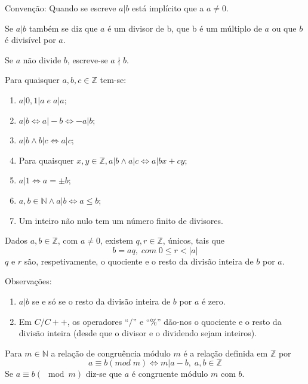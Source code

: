 Convenção: Quando se escreve $a|b$ está implícito que a $a \neq 0$.

Se $a|b$ também se diz que $a$ é um divisor de b, que b é um múltiplo de $a$ ou que $b$ é divisível por $a$.

Se $a$ não divide $b$, escreve-se $a \nmid b$.

Para quaisquer $a,b,c \in \mathbb{Z}$ tem-se:

\begin{enumerate}
    \item{ $a|0, 1|a \;e\;a|a$};
    \item{ $a|b 	\Leftrightarrow a|-b \Leftrightarrow -a|b$};
    \item{$a|b \land b|c \Leftrightarrow a|c$};
    \item Para quaisquer $x,y \in \mathbb{Z}, a|b \land a|c \Leftrightarrow a|bx + cy$;
    \item $a|1 \Leftrightarrow a=\pm b$;
    \item $a,b \in \mathbb{N} \land a|b \Leftrightarrow a \leq b$;
    \item Um inteiro não nulo tem um número finito de divisores.
\end{enumerate}


\begin{teorema} 
\label{teo:AlgoritmoDivisaoInteira}
Dados $a,b \in \mathbb{Z}$, com $a \neq 0$, existem $q,r \in \mathbb{Z}$, únicos, tais que $$b=aq, \; com \; 0\leq r < |a|$$
$q$ e $r$ são, respetivamente, o quociente e o resto da divisão inteira de $b$ por $a$.
\end{teorema}

Observações:

\begin{enumerate}
    \item $a|b$ se e só se o resto da divisão inteira de $b$ por $a$ é zero.
    \item Em $C/C++$, os operadores ``$/$'' e ``\%'' dão-nos o quociente e o resto da divisão inteira (desde que o divisor e o dividendo sejam inteiros).
\end{enumerate}

\begin{definicao}
\label{def:congruenciamodm}
Para $m \in \mathbb{N}$ a relação de congruência módulo $m$ é a relação definida em $\mathbb{Z}$ por $$a \equiv b (mod\;m) \Leftrightarrow  m|a-b, \; a,b \in \mathbb{Z}$$
Se $a \equiv b (\mod m)$ diz-se que $a$ é congruente módulo $m$ com $b$.
\end{definicao} 

